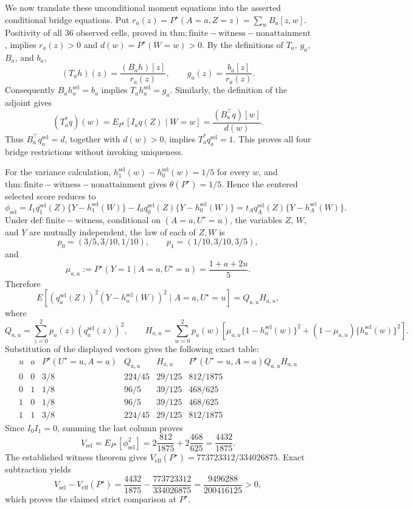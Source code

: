 We now translate these unconditional moment equations into the asserted conditional bridge equations.  Put
\(r_a(z)=P^\star(A=a,Z=z)=\sum_wB_a[z,w]\).  Positivity of all \(36\) observed cells, proved in \(\mathrm{thm:finite-witness-nonattainment}\), implies \(r_a(z)>0\) and \(d(w)=P^\star(W=w)>0\).  By the definitions of \(T_a\), \(g_a\), \(B_a\), and \(b_a\),
\[
(T_ah)(z)=\frac{(B_ah)[z]}{r_a(z)},
\qquad
g_a(z)=\frac{b_a[z]}{r_a(z)}.
\]
Consequently \(B_ah_a^{\mathrm{sel}}=b_a\) implies
\(T_ah_a^{\mathrm{sel}}=g_a\).  Similarly, the definition of the adjoint gives
\[
(T_a^*q)(w)
=E_{P^\star}[I_aq(Z)\mid W=w]
=\frac{(B_a^\top q)[w]}{d(w)}.
\]
Thus \(B_a^\top q_a^{\mathrm{sel}}=d\), together with \(d(w)>0\), implies
\(T_a^*q_a^{\mathrm{sel}}=1\).  This proves all four bridge restrictions without invoking uniqueness.

For the variance calculation, \(h_1^{\mathrm{sel}}(w)-h_0^{\mathrm{sel}}(w)=1/5\) for every \(w\), and \(\mathrm{thm:finite-witness-nonattainment}\) gives \(\theta(P^\star)=1/5\).  Hence the centered selected score reduces to
\[
\phi_{\mathrm{sel}}
=I_1q_1^{\mathrm{sel}}(Z)\{Y-h_1^{\mathrm{sel}}(W)\}
-I_0q_0^{\mathrm{sel}}(Z)\{Y-h_0^{\mathrm{sel}}(W)\}
=t_Aq_A^{\mathrm{sel}}(Z)\{Y-h_A^{\mathrm{sel}}(W)\}.
\]
Under \(\mathrm{def:finite-witness}\), conditional on \((A=a,U^\star=u)\), the variables \(Z\), \(W\), and \(Y\) are mutually independent, the law of each of \(Z,W\) is
\[
p_0=(3/5,3/10,1/10),\qquad p_1=(1/10,3/10,3/5),
\]
and
\[
\mu_{a,u}:=P^\star(Y=1\mid A=a,U^\star=u)=\frac{1+a+2u}{5}.
\]
Therefore
\[
E[(q_a^{\mathrm{sel}}(Z))^2(Y-h_a^{\mathrm{sel}}(W))^2\mid A=a,U^\star=u]
=Q_{a,u}H_{a,u},
\]
where
\[
Q_{a,u}=\sum_{z=0}^2p_u(z)(q_a^{\mathrm{sel}}(z))^2,
\qquad
H_{a,u}=\sum_{w=0}^2p_u(w)
\left[\mu_{a,u}\{1-h_a^{\mathrm{sel}}(w)\}^2
+(1-\mu_{a,u})\{h_a^{\mathrm{sel}}(w)\}^2\right].
\]
Substitution of the displayed vectors gives the following exact table:
\[
\begin{array}{c|c|c|c|c|c}
u&a&P^\star(U^\star=u,A=a)&Q_{a,u}&H_{a,u}&P^\star(U^\star=u,A=a)Q_{a,u}H_{a,u}\\ \hline
0&0&3/8&224/45&29/125&812/1875\\
0&1&1/8&96/5&39/125&468/625\\
1&0&1/8&96/5&39/125&468/625\\
1&1&3/8&224/45&29/125&812/1875
\end{array}
\]
Since \(I_0I_1=0\), summing the last column proves
\[
V_{\mathrm{sel}}
=E_{P^\star}[\phi_{\mathrm{sel}}^2]
=2\frac{812}{1875}+2\frac{468}{625}
=\frac{4432}{1875}.
\]
The established witness theorem gives
\(V_{\mathrm{eff}}(P^\star)=773723312/334026875\).  Exact subtraction yields
\[
V_{\mathrm{sel}}-V_{\mathrm{eff}}(P^\star)
=\frac{4432}{1875}-\frac{773723312}{334026875}
=\frac{9496288}{200416125}>0,
\]
which proves the claimed strict comparison at \(P^\star\).

